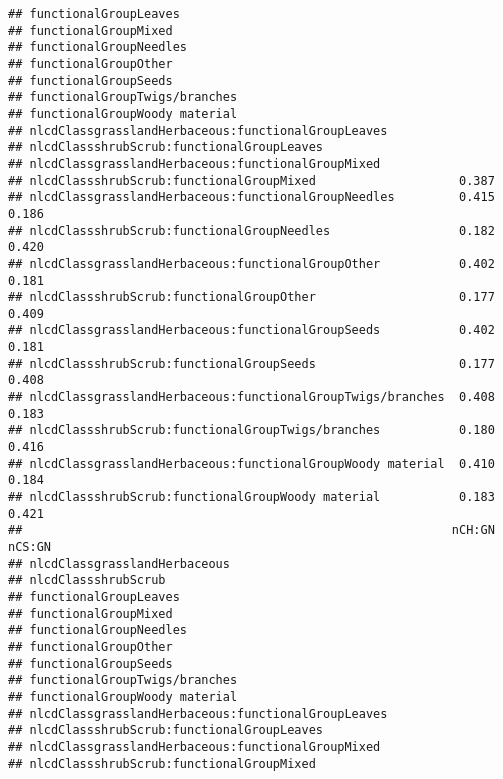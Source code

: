 \documentclass[]{article}
\begin{document}
\begin{verbatim}
## functionalGroupLeaves                                                   
## functionalGroupMixed                                                    
## functionalGroupNeedles                                                  
## functionalGroupOther                                                    
## functionalGroupSeeds                                                    
## functionalGroupTwigs/branches                                           
## functionalGroupWoody material                                           
## nlcdClassgrasslandHerbaceous:functionalGroupLeaves                      
## nlcdClassshrubScrub:functionalGroupLeaves                               
## nlcdClassgrasslandHerbaceous:functionalGroupMixed                       
## nlcdClassshrubScrub:functionalGroupMixed                    0.387       
## nlcdClassgrasslandHerbaceous:functionalGroupNeedles         0.415  0.186
## nlcdClassshrubScrub:functionalGroupNeedles                  0.182  0.420
## nlcdClassgrasslandHerbaceous:functionalGroupOther           0.402  0.181
## nlcdClassshrubScrub:functionalGroupOther                    0.177  0.409
## nlcdClassgrasslandHerbaceous:functionalGroupSeeds           0.402  0.181
## nlcdClassshrubScrub:functionalGroupSeeds                    0.177  0.408
## nlcdClassgrasslandHerbaceous:functionalGroupTwigs/branches  0.408  0.183
## nlcdClassshrubScrub:functionalGroupTwigs/branches           0.180  0.416
## nlcdClassgrasslandHerbaceous:functionalGroupWoody material  0.410  0.184
## nlcdClassshrubScrub:functionalGroupWoody material           0.183  0.421
##                                                            nCH:GN nCS:GN
## nlcdClassgrasslandHerbaceous                                            
## nlcdClassshrubScrub                                                     
## functionalGroupLeaves                                                   
## functionalGroupMixed                                                    
## functionalGroupNeedles                                                  
## functionalGroupOther                                                    
## functionalGroupSeeds                                                    
## functionalGroupTwigs/branches                                           
## functionalGroupWoody material                                           
## nlcdClassgrasslandHerbaceous:functionalGroupLeaves                      
## nlcdClassshrubScrub:functionalGroupLeaves                               
## nlcdClassgrasslandHerbaceous:functionalGroupMixed                       
## nlcdClassshrubScrub:functionalGroupMixed                                

\end{verbatim}
\end{document}
